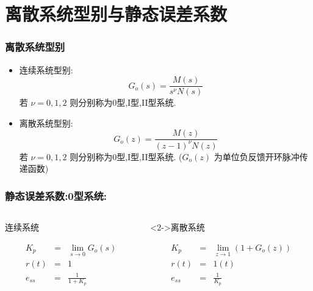 \documentclass[table]{beamer}
\begin{document}
\section{离散系统型别与静态误差系数}
\label{sec-2}
\begin{frame}
\frametitle{离散系统型别}
\label{sec-2-1}

\begin{itemize}
\item 连续系统型别:  
      \[G_o(s)=\frac{M(s)}{s^{\nu}N(s)}\]  
     若  $\nu=0,1,2$  则分别称为0型,I型,II型系统.
\item <2->离散系统型别:  
      \[G_o(z)=\frac{M(z)}{(z-1)^{\nu}N(z)}\]  
     若  $\nu=0,1,2$  则分别称为0型,I型,II型系统.
      ($G_o(z)$  为单位负反馈开环脉冲传递函数)
\end{itemize}
\end{frame}
\begin{frame}
\frametitle{静态误差系数:0型系统:}
\label{sec-2-2}
\begin{columns}
\begin{column}{0.5\textwidth}
\begin{block}{连续系统}
\label{sec-2-2-1}

\begin{eqnarray*}
K_p &=& \lim_{s\rightarrow 0}G_o(s)  \\
r(t)&=& 1 \\
e_{ss} &=& \frac{1}{1+K_p} 
\end{eqnarray*}
\end{block}
\end{column}
\begin{column}{0.5\textwidth}
\begin{block}<2->{离散系统}
\label{sec-2-2-2}

\begin{eqnarray*}
K_p &=& \lim_{z\rightarrow 1}(1+G_o(z))  \\
r(t)&=& 1(t) \\
e_{ss} &=& \frac{1}{K_p} 
\end{eqnarray*}
\end{block}
\end{column}
\end{columns}
\end{frame}
\end{document}
